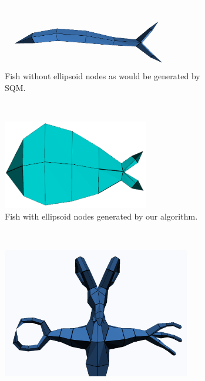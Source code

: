 \begin{figure}[ht]
        \centering
        \begin{subfigure}[b]{0.45\textwidth}
        	\centering
			\includegraphics[width=0.8\textwidth]{images/ryba_no_elips}
            \caption{Fish without ellipsoid nodes as would be generated by SQM.}
            \label{fig:comp_eel}
        \end{subfigure}%
        ~ %
        \begin{subfigure}[b]{0.45\textwidth}
        	\centering
			\includegraphics[width=0.7\textwidth]{images/ellipsoid_fish_ilu_2}
            \caption{Fish with ellipsoid nodes generated by our algorithm.}
            \label{fig:comp_fish}
        \end{subfigure}
        \\ %
        \begin{subfigure}[b]{0.45\textwidth}
        	\centering
			\includegraphics[width=0.9\textwidth]{images/goat_amput_sqm_3}

\end{subfigure}
\end{figure}
